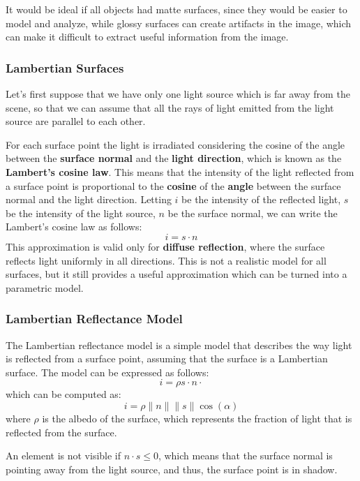 It would be ideal if all objects had matte surfaces, since they would be easier to model and analyze, while glossy surfaces can create artifacts in the image, which can make it difficult to extract useful information from the image.

\subsubsection*{Lambertian Surfaces}
Let's first suppose that we have only one light source which is far away from the scene, so that we can assume that all the rays of light emitted from the light source are parallel to each other.

For each surface point the light is irradiated considering the cosine of the angle between the \textbf{surface normal} and the \textbf{light direction}, which is known as the \textbf{Lambert's cosine law}.
This means that the intensity of the light reflected from a surface point is proportional to the \textbf{cosine} of the \textbf{angle} between the surface normal and the light direction.
Letting $i$ be the intensity of the reflected light, $s$ be the intensity of the light source, $n$ be the surface normal, we can write the Lambert's cosine law as follows:
\[i = s \cdot n\]
This approximation is valid only for \textbf{diffuse reflection}, where the surface reflects light uniformly in all directions.
This is not a realistic model for all surfaces, but it still provides a useful approximation which can be turned into a parametric model.

\subsubsection*{Lambertian Reflectance Model}
The Lambertian reflectance model is a simple model that describes the way light is reflected from a surface point, assuming that the surface is a Lambertian surface.
The model can be expressed as follows:
\begin{equation}
    \label{eq:lambertian_reflectance_model}
    i = \rho s \cdot n \cdot
\end{equation}
which can be computed as:
\[ i = \rho \|n\| \|s\| \cos(\alpha)\]
where $\rho$ is the albedo of the surface, which represents the fraction of light that is reflected from the surface.

An element is not visible if $n \cdot s \leq 0$, which means that the surface normal is pointing away from the light source, and thus, the surface point is in shadow.

